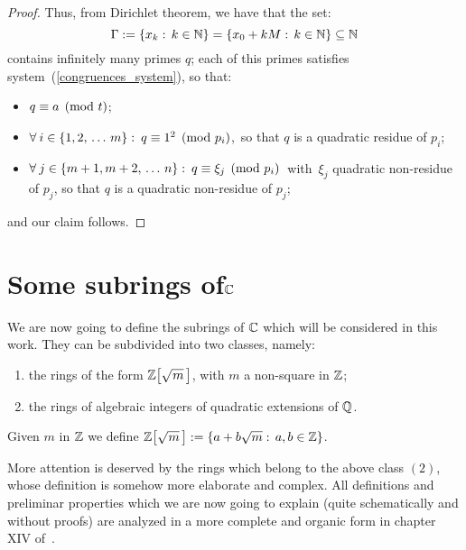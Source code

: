\begin{proof}
Thus, from Dirichlet theorem, we have that the set:
$$
\Gamma:= \left\{x_k:\, k \in \mathbb{N}\right\} =
\left\{x_0 + kM:\, k \in \mathbb{N}\right\} \subseteq \mathbb{N}
$$
contains infinitely many primes $q$; each of this primes
satisfies system~(\ref{congruences_system}), so that:
%
\begin{itemize}
%
\item
$q \equiv a \pmod t$;
%
\item $\forall\:i \in \{1, 2,\,\ldots\, m\}:\:q \equiv
1^2 \pmod{p_i}$,\, so that $q$ is a quadratic residue of
$p_i$;
%
\item $\forall\:j \in \{m+1, m+2,\,\ldots\, n\}:\:q \equiv
\xi_j \pmod{p_i}$\, with\, $\xi_j$ quadratic non-residue
of $p_j$, so that $q$ is a quadratic non-residue of $p_j$;
%
\end{itemize}
%
and our claim follows.
\end{proof}


\section{Some subrings of\enskip$\mathbb{C}$}\label{C_subrings}

We are now going to define the subrings of $\mathbb{C}$ which
will be considered in this work. They can be subdivided
into two classes, namely:

\begin{enumerate}
 \item the rings of the form $\ZZ{m}$, with $m$ a
       non-square in $\mathbb{Z}$;
 \item the rings of algebraic integers of quadratic
       extensions of $\mathbb{Q}$.
\end{enumerate}

\begin{defn} Given $m$ in $\mathbb{Z}$ we define
$\ZZ{m} := \{ a + b\sqrt m:\, a,b \in \Z \}$.
\end{defn}
%

More attention is deserved by the rings which belong to the above class
$(2)$, whose definition is somehow more elaborate and complex.
All definitions and preliminar properties which we are now going to
explain (quite schematically and without proofs) are analyzed in a more
complete and organic form in chapter XIV of~\cite{H&W}.

